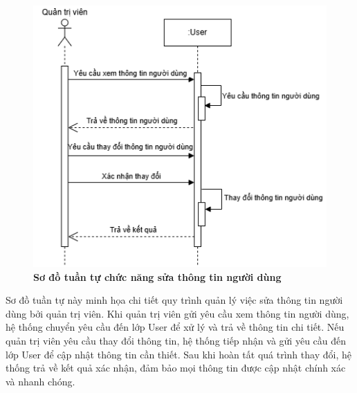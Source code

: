 \begin{figure}[H]
	\centering
	\includegraphics[width=12cm,height=10cm]{Images/sequence/user/update.drawio.png}
	\caption[Sơ đồ tuần tự chức năng sửa thông tin người dùng]{\bfseries \fontsize{12pt}{0pt}
		\selectfont Sơ đồ tuần tự chức năng sửa thông tin người dùng}
	\label{sequence_update_user} %
\end{figure}
Sơ đồ tuần tự này minh họa chi tiết quy trình quản lý việc sửa thông tin người dùng bởi quản trị viên. Khi quản trị viên gửi yêu cầu xem thông tin người dùng, hệ thống chuyển yêu cầu đến lớp User để xử lý và trả về thông tin chi tiết.
Nếu quản trị viên yêu cầu thay đổi thông tin, hệ thống tiếp nhận và gửi yêu cầu đến lớp User để cập nhật thông tin cần thiết. Sau khi hoàn tất quá trình thay đổi, hệ thống trả về kết quả xác nhận, đảm bảo mọi thông tin được cập nhật chính xác và nhanh chóng.

